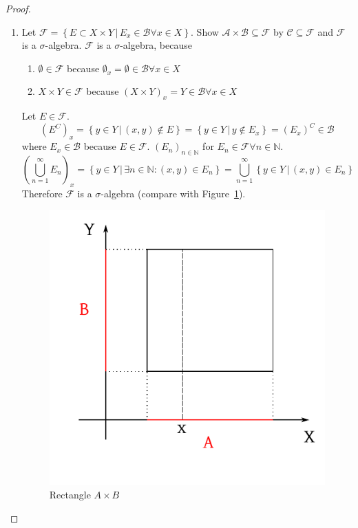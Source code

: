 \documentclass{article}
\newcommand{\setdef}[2]{\left\{\left.#1\,\right|\,#2\right\}}
\begin{document}
\begin{proof}
  \begin{enumerate}
    \item Let $\mathcal F = \setdef{E \subset X \times Y}{E_x \in \mathcal B \forall x \in X}$. Show $\mathcal A \times \mathcal B \subseteq \mathcal F$
      by $\mathcal C \subseteq \mathcal F$ and $\mathcal F$ is a $\sigma$-algebra. $\mathcal F$ is a $\sigma$-algebra, because
      \begin{enumerate}
        \item $\emptyset \in \mathcal F$ because $\emptyset_x = \emptyset \in \mathcal B \forall x \in X$
        \item $X \times Y \in \mathcal F$ because $(X \times Y)_x = Y \in \mathcal B \forall x \in X$
      \end{enumerate}
      Let $E \in \mathcal F$.
      \[ (E^C)_x = \setdef{y \in Y}{(x, y) \not\in E} = \setdef{y \in Y}{y \not\in E_x} = (E_x)^C \in \mathcal B \]
      where $E_x \in \mathcal B$ because $E \in \mathcal F$.
      $(E_n)_{n \in \mathbb N}$ for $E_n \in \mathcal F \forall n \in \mathbb N$.
      \[ \left(\bigcup_{n=1}^\infty E_n\right)_x = \setdef{y \in Y}{\exists n \in \mathbb N: (x,y) \in E_n} = \bigcup_{n=1}^\infty \setdef{y \in Y}{(x,y) \in E_n} \]
      Therefore $\mathcal F$ is a $\sigma$-algebra (compare with Figure~\ref{img:rectAB}).
      \begin{figure}[!h]
        \begin{center}
          \includegraphics{img/22.pdf}
          \caption{Rectangle $A \times B$}
          \label{img:rectAB}
        \end{center}
      \end{figure}


\end{enumerate}
\end{proof}
\end{document}
